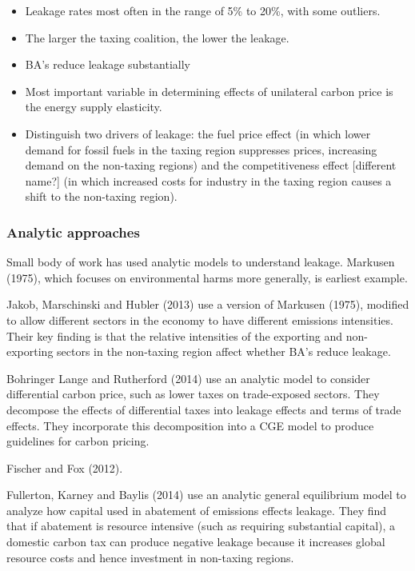 \documentclass[notitlepage,12pt]{article}
\begin{document}
\begin{itemize}
\item Leakage rates most often in the range of 5\% to 20\%, with some
outliers.

\item The larger the taxing coalition, the lower the leakage.

\item BA's reduce leakage substantially

\item Most important variable in determining effects of unilateral carbon
price is the energy supply elasticity.

\item Distinguish two drivers of leakage: the fuel price effect (in which
lower demand for fossil fuels in the taxing region suppresses prices,
increasing demand on the non-taxing regions) and the competitiveness effect
[different name?] (in which increased costs for industry in the taxing
region causes a shift to the non-taxing region).
\end{itemize}

\subsubsection{Analytic approaches}

Small body of work has used analytic models to understand leakage. Markusen
(1975), which focuses on environmental harms more generally, is earliest
example.

Jakob, Marschinski and Hubler (2013) use a version of Markusen (1975),
modified to allow different sectors in the economy to have different
emissions intensities. Their key finding is that the relative intensities of
the exporting and non-exporting sectors in the non-taxing region affect
whether BA's reduce leakage.

Bohringer Lange and Rutherford (2014) use an analytic model to consider
differential carbon price, such as lower taxes on trade-exposed sectors.
They decompose the effects of differential taxes into leakage effects and
terms of trade effects. They incorporate this decomposition into a CGE model
to produce guidelines for carbon pricing.

Fischer and Fox (2012).

Fullerton, Karney and Baylis (2014) use an analytic general equilibrium
model to analyze how capital used in abatement of emissions effects leakage.
They find that if abatement is resource intensive (such as requiring
substantial capital), a domestic carbon tax can produce negative leakage
because it increases global resource costs and hence investment in
non-taxing regions.
\end{document}
